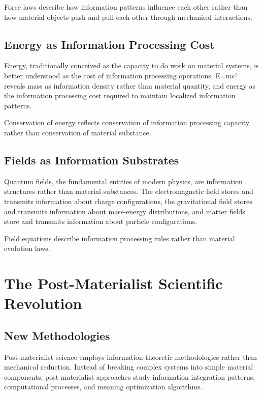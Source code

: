 \documentclass[12pt]{article}
\begin{document}
Force laws describe how information patterns influence each other rather than how material objects push and pull each other through mechanical interactions.

\subsection{Energy as Information Processing Cost}

Energy, traditionally conceived as the capacity to do work on material systems, is better understood as the cost of information processing operations. E=mc² reveals mass as information density rather than material quantity, and energy as the information processing cost required to maintain localized information patterns.

Conservation of energy reflects conservation of information processing capacity rather than conservation of material substance.

\subsection{Fields as Information Substrates}

Quantum fields, the fundamental entities of modern physics, are information structures rather than material substances. The electromagnetic field stores and transmits information about charge configurations, the gravitational field stores and transmits information about mass-energy distributions, and matter fields store and transmits information about particle configurations.

Field equations describe information processing rules rather than material evolution laws.

\section{The Post-Materialist Scientific Revolution}

\subsection{New Methodologies}

Post-materialist science employs information-theoretic methodologies rather than mechanical reduction. Instead of breaking complex systems into simple material components, post-materialist approaches study information integration patterns, computational processes, and meaning optimization algorithms.
\end{document}
